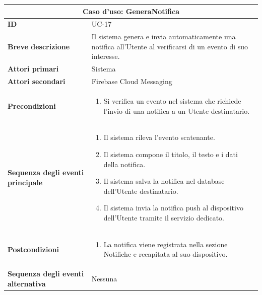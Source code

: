\documentclass[a4paper]{report}
\begin{document}
\begin{table}[H]
\vspace*{-0cm}
\renewcommand{\arraystretch}{1.9}
\begin{tabular}{|p{3.9cm}|p{9.9cm}|}
\hline
\multicolumn{2}{|c|}{\textbf{Caso d’uso: GeneraNotifica}} \\ \hline
\textbf{ID} & UC-17 \\ \hline
\textbf{Breve descrizione} & Il sistema genera e invia automaticamente una notifica all'Utente al verificarsi di un evento di suo interesse. \\ \hline
\textbf{Attori primari} & Sistema \\ \hline
\textbf{Attori secondari} & Firebase Cloud Messaging \\ \hline
\textbf{Precondizioni} & \begin{enumerate}[leftmargin=14pt,label=\arabic*.,labelsep=0.5em,topsep=0pt,partopsep=0pt,parsep=0pt,itemsep=0pt]
    \item Si verifica un evento nel sistema che richiede l'invio di una notifica a un Utente destinatario.
\end{enumerate} \\ \hline
\textbf{Sequenza degli eventi principale} &
\begin{enumerate}[leftmargin=14pt,label=\arabic*.,labelsep=0.5em,topsep=0pt,partopsep=0pt,parsep=0pt,itemsep=0pt]
   \item Il sistema rileva l'evento scatenante.
   \item Il sistema compone il titolo, il testo e i dati della notifica.
   \item Il sistema salva la notifica nel database dell'Utente destinatario.
   \item Il sistema invia la notifica push al dispositivo dell'Utente tramite il servizio dedicato.
\end{enumerate}\\ \hline
\textbf{Postcondizioni} &
\begin{enumerate}[leftmargin=14pt,label=\arabic*.,labelsep=0.5em,topsep=0pt,partopsep=0pt,parsep=0pt,itemsep=0pt]
\item La notifica viene registrata nella sezione Notifiche e recapitata al suo dispositivo.
\end{enumerate} \\ \hline
\textbf{Sequenza degli eventi alternativa} & Nessuna \\ \hline
\end{tabular}
\end{table}
\end{document}

